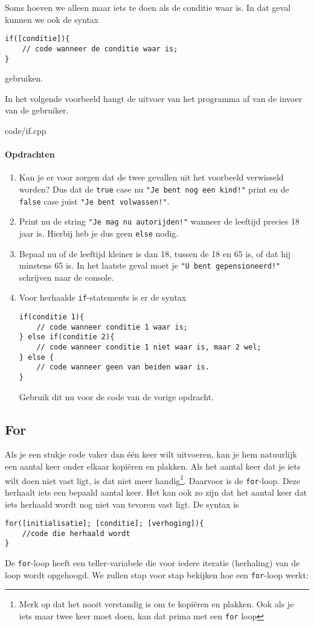\documentclass[12pt,a4paper]{article}
\newcommand{\code}{}
\newcommand{\icode}{\lstinline}
\begin{document}
Soms hoeven we alleen maar iets te doen als de conditie waar is. In dat geval kunnen we ook de syntax
\begin{lstlisting}
if([conditie]){
	// code wanneer de conditie waar is;
}
\end{lstlisting}
gebruiken.

In het volgende voorbeeld hangt de uitvoer van het programma af van de invoer van de gebruiker.

\code{code/if.cpp}

\paragraph{Opdrachten}
\begin{enumerate}
		\item
		Kan je er voor zorgen dat de twee gevallen uit het voorbeeld verwisseld worden? Dus dat de \icode{true} case nu \icode{"Je bent nog een kind!"} print en de \icode{false} case juist \icode{"Je bent volwassen!"}.
		\item
			Print nu de string \icode{"Je mag nu autorijden!"} wanneer de leeftijd precies 18 jaar is. Hierbij heb je dus geen \icode{else} nodig.
		\item
			Bepaal nu of de leeftijd kleiner is dan 18, tussen de 18 en 65 is, of dat hij minstens 65 is. In het laatste geval moet je \icode{"U bent gepensioneerd!"} schrijven naar de console.
		\item
			Voor herhaalde \icode{if}-statements is er de syntax
\begin{lstlisting}
if(conditie 1){
	// code wanneer conditie 1 waar is;
} else if(conditie 2){
	// code wanneer conditie 1 niet waar is, maar 2 wel;
} else {
	// code wanneer geen van beiden waar is.
}
\end{lstlisting}
Gebruik dit nu voor de code van de vorige opdracht.
\end{enumerate}


\subsection{For}
Als je een stukje code vaker dan \'e\'en keer wilt uitvoeren, kan je hem natuurlijk een aantal keer onder elkaar kopi\"eren en plakken. Als het aantal keer dat je iets wilt doen niet vast ligt, is dat niet meer handig\footnote{Merk op dat het nooit verstandig is om te kopi\"eren en plakken. Ook als je iets maar twee keer moet doen, kan dat prima met een \icode{for} loop}. Daarvoor is de \icode{for}-loop.
Deze herhaalt iets een bepaald aantal keer. Het kan ook zo zijn dat het aantal keer dat iets herhaald wordt nog niet van tevoren vast ligt. De syntax is 
\begin{lstlisting}
for([initialisatie]; [conditie]; [verhoging]){
	//code die herhaald wordt
}
\end{lstlisting}
De \icode{for}-loop heeft een teller-variabele die voor iedere iteratie (herhaling) van de loop wordt opgehoogd. We zullen stap voor stap bekijken hoe een \icode{for}-loop werkt:
\end{document}
